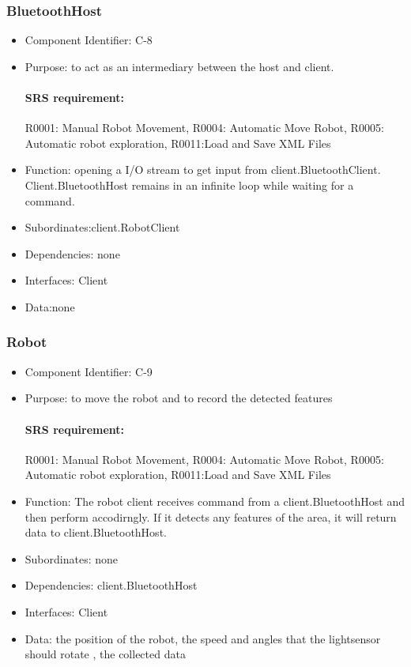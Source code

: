 \documentclass[11pt, a4paper]{report}
\begin{document}
\subsubsection{BluetoothHost}
\begin{itemize}
\item Component Identifier: C-8
\item Purpose: to act as an intermediary between the host and client.
\paragraph{SRS requirement:} R0001: Manual Robot Movement, R0004: Automatic Move Robot,
R0005: Automatic robot exploration, R0011:Load and Save XML Files
\item Function: opening a I/O stream to get input from client.BluetoothClient.
Client.BluetoothHost remains in an infinite loop while waiting for a command.
\item Subordinates:client.RobotClient
\item Dependencies: none
\item Interfaces: Client 
\item Data:none
\end{itemize}



\subsubsection{Robot}
\begin{itemize}
\item Component Identifier: C-9
\item Purpose: to move the robot and to record the detected features
\paragraph{SRS requirement:}R0001: Manual Robot Movement, R0004: Automatic Move Robot,
R0005: Automatic robot exploration, R0011:Load and Save XML Files
\item Function: The robot client receives command from a client.BluetoothHost and then perform 
accodirngly. If it detects any features of the area, it will return data to client.BluetoothHost.
\item Subordinates: none
\item Dependencies: client.BluetoothHost
\item Interfaces:  Client
\item Data: the position of the robot, the speed and angles that the lightsensor should rotate
, the collected data
\end{itemize}
\end{document}
